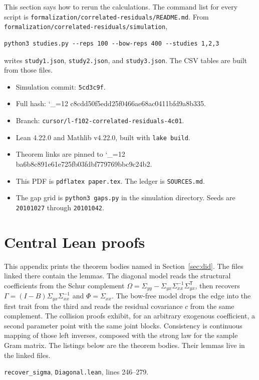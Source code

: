 \documentclass[11pt]{article}
\makeatletter
\newcommand{\sha}{\begingroup\catcode`\_=12 \sha@read}
\newcommand{\sha@read}[1]{\ttfamily\sha@loop#1\relax\endgroup}
\def\sha@loop#1{%
  \ifx\relax#1\else
    #1\allowbreak
    \expandafter\sha@loop
  \fi}
\makeatother
\begin{document}
This section says how to rerun the calculations. The command list for every script is
\texttt{formalization/correlated-residuals/README.md}.
From \texttt{formalization/correlated-residuals/simulation},
\begin{verbatim}
python3 studies.py --reps 100 --bow-reps 400 --studies 1,2,3
\end{verbatim}
writes \texttt{study1.json}, \texttt{study2.json}, and
\texttt{study3.json}. The CSV tables are built from those files.
\begin{itemize}
\item Simulation commit: \texttt{5cd3c9f}.
\item Full hash: \sha{6c8cdd50f5edd25f0466ae68ac0411bfd9a8b335}.
\item Branch: \texttt{cursor/l-f102-correlated-residuals-4c01}.
\item Lean 4.22.0 and Mathlib v4.22.0, built with \texttt{lake build}.
\item Theorem links are pinned to \sha{1ba6b8c891e61e725fb03fdbf779769bbc9c24b2}.
\item This PDF is \texttt{pdflatex paper.tex}. The ledger is \texttt{SOURCES.md}.
\item The gap grid is \texttt{python3 gaps.py} in the simulation directory. Seeds are \texttt{20101027} through \texttt{20101042}.
\end{itemize}

\appendix
\section{Central Lean proofs}
\label{app:lean}

This appendix prints the theorem bodies named in Section~\ref{sec:did}. The
files linked there contain the lemmas. The diagonal model reads the structural coefficients from the Schur complement
$\Omega=\Sigma_{yy}-\Sigma_{yx}\Sigma_{xx}^{-1}\Sigma_{yx}^{\mathsf T}$, then
recovers $\Gamma=(I-B)\Sigma_{yx}\Sigma_{xx}^{-1}$ and $\Phi=\Sigma_{xx}$.
The bow-free model drops the edge into the first trait from the third and
reads the residual covariance $c$ from the same complement. The collision
proofs exhibit, for an arbitrary exogenous coefficient, a second parameter
point with the same joint blocks. Consistency is continuous mapping of those
left inverses, composed with the strong law for the sample Gram matrix.
The listings below are the theorem bodies. Their lemmas live in the linked files.

\medskip
\noindent\texttt{recover\_sigma}, \texttt{Diagonal.lean}, lines 246--279.

\end{document}
